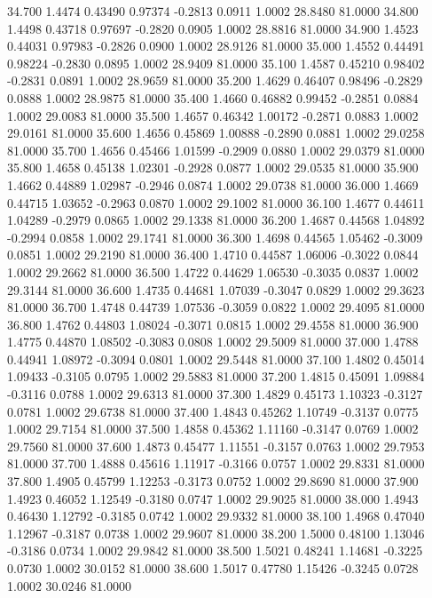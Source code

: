   34.700   1.4474   0.43490   0.97374  -0.2813   0.0911   1.0002  28.8480  81.0000
  34.800   1.4498   0.43718   0.97697  -0.2820   0.0905   1.0002  28.8816  81.0000
  34.900   1.4523   0.44031   0.97983  -0.2826   0.0900   1.0002  28.9126  81.0000
  35.000   1.4552   0.44491   0.98224  -0.2830   0.0895   1.0002  28.9409  81.0000
  35.100   1.4587   0.45210   0.98402  -0.2831   0.0891   1.0002  28.9659  81.0000
  35.200   1.4629   0.46407   0.98496  -0.2829   0.0888   1.0002  28.9875  81.0000
  35.400   1.4660   0.46882   0.99452  -0.2851   0.0884   1.0002  29.0083  81.0000
  35.500   1.4657   0.46342   1.00172  -0.2871   0.0883   1.0002  29.0161  81.0000
  35.600   1.4656   0.45869   1.00888  -0.2890   0.0881   1.0002  29.0258  81.0000
  35.700   1.4656   0.45466   1.01599  -0.2909   0.0880   1.0002  29.0379  81.0000
  35.800   1.4658   0.45138   1.02301  -0.2928   0.0877   1.0002  29.0535  81.0000
  35.900   1.4662   0.44889   1.02987  -0.2946   0.0874   1.0002  29.0738  81.0000
  36.000   1.4669   0.44715   1.03652  -0.2963   0.0870   1.0002  29.1002  81.0000
  36.100   1.4677   0.44611   1.04289  -0.2979   0.0865   1.0002  29.1338  81.0000
  36.200   1.4687   0.44568   1.04892  -0.2994   0.0858   1.0002  29.1741  81.0000
  36.300   1.4698   0.44565   1.05462  -0.3009   0.0851   1.0002  29.2190  81.0000
  36.400   1.4710   0.44587   1.06006  -0.3022   0.0844   1.0002  29.2662  81.0000
  36.500   1.4722   0.44629   1.06530  -0.3035   0.0837   1.0002  29.3144  81.0000
  36.600   1.4735   0.44681   1.07039  -0.3047   0.0829   1.0002  29.3623  81.0000
  36.700   1.4748   0.44739   1.07536  -0.3059   0.0822   1.0002  29.4095  81.0000
  36.800   1.4762   0.44803   1.08024  -0.3071   0.0815   1.0002  29.4558  81.0000
  36.900   1.4775   0.44870   1.08502  -0.3083   0.0808   1.0002  29.5009  81.0000
  37.000   1.4788   0.44941   1.08972  -0.3094   0.0801   1.0002  29.5448  81.0000
  37.100   1.4802   0.45014   1.09433  -0.3105   0.0795   1.0002  29.5883  81.0000
  37.200   1.4815   0.45091   1.09884  -0.3116   0.0788   1.0002  29.6313  81.0000
  37.300   1.4829   0.45173   1.10323  -0.3127   0.0781   1.0002  29.6738  81.0000
  37.400   1.4843   0.45262   1.10749  -0.3137   0.0775   1.0002  29.7154  81.0000
  37.500   1.4858   0.45362   1.11160  -0.3147   0.0769   1.0002  29.7560  81.0000
  37.600   1.4873   0.45477   1.11551  -0.3157   0.0763   1.0002  29.7953  81.0000
  37.700   1.4888   0.45616   1.11917  -0.3166   0.0757   1.0002  29.8331  81.0000
  37.800   1.4905   0.45799   1.12253  -0.3173   0.0752   1.0002  29.8690  81.0000
  37.900   1.4923   0.46052   1.12549  -0.3180   0.0747   1.0002  29.9025  81.0000
  38.000   1.4943   0.46430   1.12792  -0.3185   0.0742   1.0002  29.9332  81.0000
  38.100   1.4968   0.47040   1.12967  -0.3187   0.0738   1.0002  29.9607  81.0000
  38.200   1.5000   0.48100   1.13046  -0.3186   0.0734   1.0002  29.9842  81.0000
  38.500   1.5021   0.48241   1.14681  -0.3225   0.0730   1.0002  30.0152  81.0000
  38.600   1.5017   0.47780   1.15426  -0.3245   0.0728   1.0002  30.0246  81.0000
